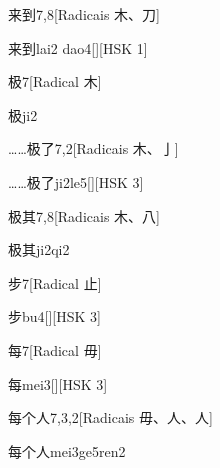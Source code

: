 \begin{entry}{来到}{7,8}[Radicais ⽊、⼑]
  \begin{phonetics}{来到}{lai2 dao4}[][HSK 1]
  \end{phonetics}
\end{entry}

\begin{entry}{极}{7}[Radical ⽊]
  \begin{phonetics}{极}{ji2}
  \end{phonetics}
\end{entry}

\begin{entry}{……极了}{7,2}[Radicais ⽊、⼅]
  \begin{phonetics}{……极了}{ji2le5}[][HSK 3]
  \end{phonetics}
\end{entry}

\begin{entry}{极其}{7,8}[Radicais ⽊、⼋]
  \begin{phonetics}{极其}{ji2qi2}
  \end{phonetics}
\end{entry}

\begin{entry}{步}{7}[Radical ⽌]
  \begin{phonetics}{步}{bu4}[][HSK 3]
  \end{phonetics}
\end{entry}

\begin{entry}{每}{7}[Radical ⽏]
  \begin{phonetics}{每}{mei3}[][HSK 3]
  \end{phonetics}
\end{entry}

\begin{entry}{每个人}{7,3,2}[Radicais ⽏、⼈、⼈]
  \begin{phonetics}{每个人}{mei3ge5ren2}
  \end{phonetics}
\end{entry}

